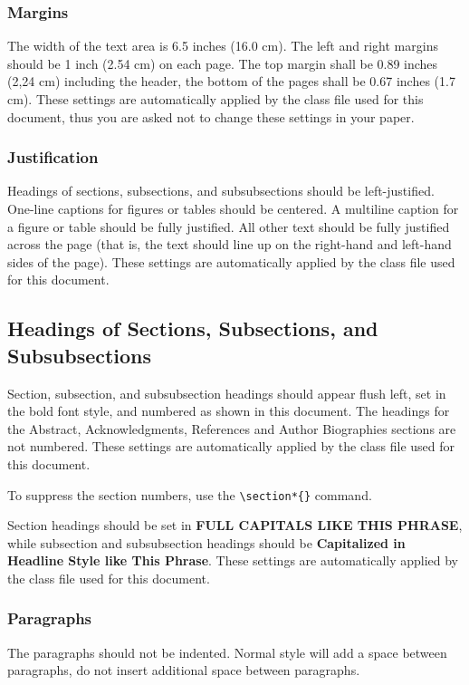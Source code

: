 \documentclass{scspaperproc}
\theoremstyle{scsthe}
\begin{document}
\subsubsection{Margins}
\label{sec:margins}

The width of the text area is 6.5 inches (16.0 cm). The left and right margins should be 1 inch (2.54 cm) on each page. The top margin shall be 0.89 inches (2,24 cm) including the header, the bottom of the pages shall be 0.67 inches (1.7 cm). These settings are automatically applied by the class file used for this document, thus you are asked not to change these settings in your paper.

\subsubsection{Justification}
Headings of sections, subsections, and subsubsections should be left-justified. One-line captions for figures or tables should be centered. A multiline caption for a figure or table should be fully justified. All other text should be fully justified across the page (that is, the text should line up on the right-hand and left-hand sides of the page). These settings are automatically applied by the class file used for this document.

\subsection{Headings of Sections, Subsections, and Subsubsections}
Section, subsection, and subsubsection headings should appear flush left, set in the bold font style, and numbered as shown in this document. The headings for the Abstract, Acknowledgments, References and Author Biographies sections are not numbered. These settings are automatically applied by the class file used for this document.

To suppress the section numbers, use the \verb+\section*{}+ command.

Section headings should be set in \textbf{\uppercase{full capitals like this phrase}}, while subsection and subsubsection headings should be \textbf{Capitalized
in Headline Style like This Phrase}. These settings are automatically applied by the class file used for this document.

\subsubsection{Paragraphs}
The paragraphs should not be indented. Normal style will add a space between paragraphs, do not insert additional space between paragraphs.
\end{document}
